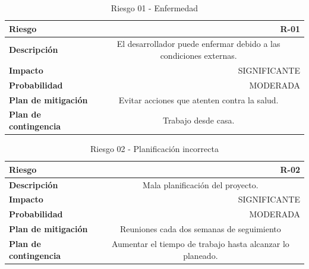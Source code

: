 \begin{table}[h!]
\centering
\begin{tabular}{|l|c}
\hline
\textbf{Riesgo}               & \multicolumn{1}{r|}{R-01}                                             \\ \hline
\textbf{Descripción}          & \multicolumn{1}{X|}{El desarrollador puede enfermar debido a las  condiciones externas.}
\\ \hline
\textbf{Impacto}              & \multicolumn{1}{r|}{SIGNIFICANTE}                                             \\ \hline
\textbf{Probabilidad}         & \multicolumn{1}{r|}{MODERADA}                                         \\ \hline
\textbf{Plan de mitigación}   & \multicolumn{1}{X|}{Evitar acciones que atenten contra la salud. }
\\ \hline
\textbf{Plan de contingencia} & \multicolumn{1}{X|}{Trabajo desde casa.}
\\ \hline
\end{tabular}
\caption{Riesgo 01 - Enfermedad}
\label{table:riskill}
\end{table}


\begin{table}[h!]
\centering
\begin{tabular}{|l|c}
\hline
\textbf{Riesgo}               & \multicolumn{1}{r|}{R-02}                                             \\ \hline
\textbf{Descripción}          & \multicolumn{1}{X|}{Mala planificación del proyecto.}
\\ \hline
\textbf{Impacto}              & \multicolumn{1}{r|}{SIGNIFICANTE}                                             \\ \hline
\textbf{Probabilidad}         & \multicolumn{1}{r|}{MODERADA}                                         \\ \hline
\textbf{Plan de mitigación}   & \multicolumn{1}{X|}{Reuniones cada dos semanas de seguimiento }
\\ \hline
\textbf{Plan de contingencia} & \multicolumn{1}{X|}{Aumentar el tiempo de trabajo hasta alcanzar lo planeado.}
\\ \hline
\end{tabular}
\caption{Riesgo 02 - Planificación incorrecta}
\label{table:malaplanif}
\end{table}


